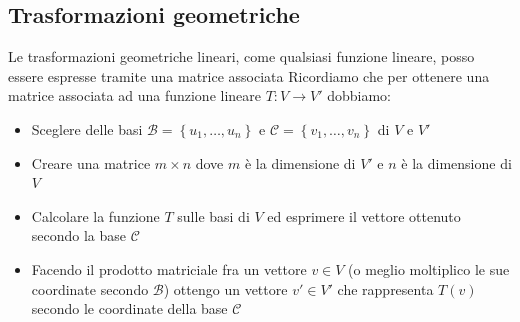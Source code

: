 \documentclass[12pt,a4paper,oneside]{article}
\begin{document}
\subsection{Trasformazioni geometriche}
Le trasformazioni geometriche lineari, come qualsiasi funzione lineare, posso essere espresse tramite una matrice associata
\vskip3mm
Ricordiamo che per ottenere una matrice associata ad una funzione lineare $ T : V \to V' $ dobbiamo:
\begin{itemize}
	\item Sceglere delle basi $ \mathcal{B} = \left\{ u_1,\ldots,u_n \right\} $ e $ \mathcal{C}= \left\{ v_1,\ldots,v_n \right\}  $	di $ V $ e $ V' $
	\item Creare una matrice $ m \times n $ dove $ m $ è la dimensione di $ V' $ e $ n $ è la dimensione di $ V $
	\item Calcolare la funzione $ T $ sulle basi di $ V $ ed esprimere il vettore ottenuto secondo la base $ \mathcal{C} $
	\item Facendo il prodotto matriciale fra un vettore $ v \in  V $ (o meglio moltiplico le sue coordinate secondo $ \mathcal{B} $) ottengo un vettore $ v' \in  V' $ che rappresenta $ T\left( v \right)  $ secondo le coordinate della base $ \mathcal{C} $
\end{itemize}
\end{document}
